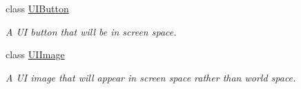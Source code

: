 \begin{DoxyCompactItemize}
class \hyperlink{classfrontier_1_1_u_i_button}{U\+I\+Button}
\begin{DoxyCompactList}\small\item\em A UI button that will be in screen space. \end{DoxyCompactList}\item 
class \hyperlink{classfrontier_1_1_u_i_image}{U\+I\+Image}
\begin{DoxyCompactList}\small\item\em A UI image that will appear in screen space rather than world space. \end{DoxyCompactList}\end{DoxyCompactItemize}
